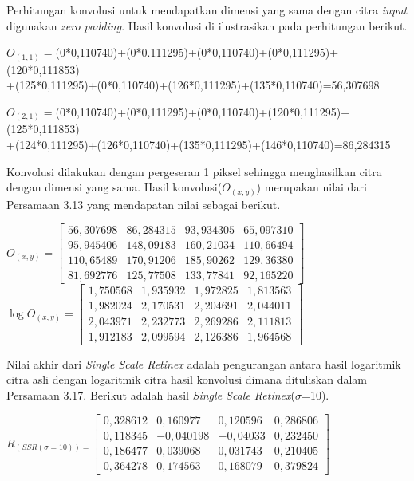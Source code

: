\noindent Perhitungan konvolusi untuk mendapatkan dimensi yang sama dengan citra \emph{input} digunakan \emph{zero padding}. Hasil konvolusi di ilustrasikan pada perhitungan berikut.

\noindent $O_{(1,1)}=$(0*0,110740)+(0*0.111295)+(0*0,110740)+(0*0,111295)+(120*0,111853)\\
+(125*0,111295)+(0*0,110740)+(126*0,111295)+(135*0,110740)=56,307698

\noindent$O_{(2,1)}=$(0*0,110740)+(0*0,111295)+(0*0,110740)+(120*0,111295)+(125*0,111853)\\
+(124*0,111295)+(126*0,110740)+(135*0,111295)+(146*0,110740)=86,284315

\noindent Konvolusi dilakukan dengan pergeseran 1 piksel sehingga menghasilkan citra dengan dimensi yang sama. Hasil konvolusi($O_{(x,y)}$) merupakan nilai dari Persamaan 3.13 yang mendapatan nilai sebagai berikut.

\noindent
$O_{(x,y)}=\left[
\begin{matrix}
56,307698&	86,284315&	93,934305&	65,097310\\
95,945406&	148,09183&	160,21034&	110,66494\\
110,65489&	170,91206&	185,90262&	129,36380\\
81,692776&	125,77508&	133,77841&	92,165220
\end{matrix}
\right]$\\
$\log O_{(x,y)}=\left[
\begin{matrix}
1,750568&	1,935932&	1,972825&	1,813563\\
1,982024&	2,170531&	2,204691&	2,044011\\
2,043971&	2,232773&	2,269286&	2,111813\\
1,912183&	2,099594&	2,126386&	1,964568

\end{matrix}
\right]$

\noindent Nilai akhir dari \emph{Single Scale Retinex} adalah pengurangan antara hasil logaritmik citra asli dengan logaritmik citra hasil konvolusi dimana dituliskan dalam Persamaan 3.17. Berikut adalah hasil \emph{Single Scale Retinex}($\sigma$=10).

\noindent
$R_{(SSR(\sigma=10))=}\left[
\begin{matrix}
0,328612&	0,160977&	0,120596&	0,286806\\
0,118345&	-0,040198&	-0,04033&	0,232450\\
0,186477&	0,039068&	0,031743&	0,210405\\
0,364278&	0,174563&	0,168079&	0,379824
\end{matrix}
\right]$

